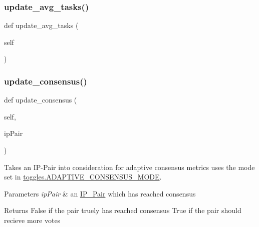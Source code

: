 \mbox{\label{classdynamicfilterapp_1_1models_1_1_predicate_a46ea5633155540e0474830a73ece68de}} 
\subsubsection{\texorpdfstring{update\_avg\_tasks()}{update\_avg\_tasks()}}
{\footnotesize\ttfamily def update\+\_\+avg\+\_\+tasks (\begin{DoxyParamCaption}\item[{}]{self }\end{DoxyParamCaption})}

\mbox{\label{classdynamicfilterapp_1_1models_1_1_predicate_a34ad16d30b9a279473a83b2c43dedfa1}} 
\subsubsection{\texorpdfstring{update\_consensus()}{update\_consensus()}}
{\footnotesize\ttfamily def update\+\_\+consensus (\begin{DoxyParamCaption}\item[{}]{self,  }\item[{}]{ip\+Pair }\end{DoxyParamCaption})}



Takes an I\+P-\/\+Pair into consideration for adaptive consensus metrics uses the mode set in \mbox{\hyperlink{namespacedynamicfilterapp_1_1toggles_a394fa3f8531c2ecc987f982367a4af2d}{toggles.\+A\+D\+A\+P\+T\+I\+V\+E\+\_\+\+C\+O\+N\+S\+E\+N\+S\+U\+S\+\_\+\+M\+O\+DE}}. 


\begin{DoxyParams}{Parameters}
{\em ip\+Pair} & an \mbox{\hyperlink{classdynamicfilterapp_1_1models_1_1_i_p___pair}{I\+P\+\_\+\+Pair}} which has reached consensus \\
\hline
\end{DoxyParams}
\begin{DoxyReturn}{Returns}
False if the pair truely has reached consensus True if the pair should recieve more votes 
\end{DoxyReturn}
\mbox{\label{classdynamicfilterapp_1_1models_1_1_predicate_a848ee4c7a2121d6e272137b6d3c8b843}} 
